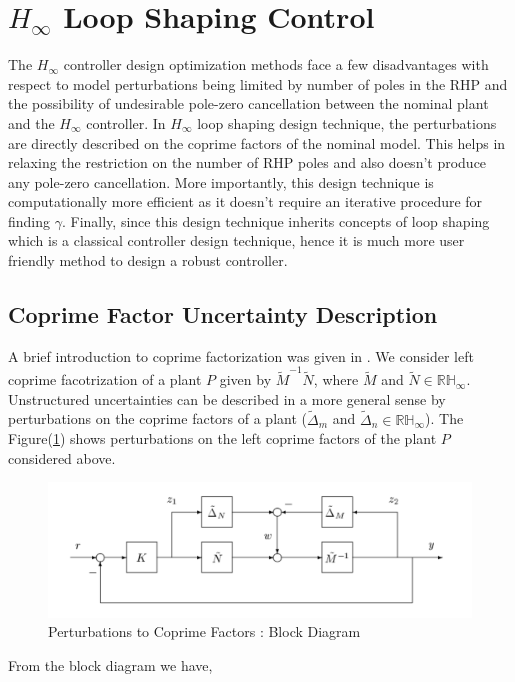 \documentclass[a4paper,12pt]{article}
\begin{document}
\section{$H_{\infty}$ Loop Shaping Control} The $H_{\infty}$ controller design optimization methods face a few disadvantages with respect to model perturbations being limited by number of poles in the RHP and the possibility of undesirable pole-zero cancellation between the nominal plant and the $H_{\infty}$ controller. In $H_{\infty}$ loop shaping design technique, the perturbations are directly described on the coprime factors of the nominal model. This helps in relaxing the restriction on the number of RHP poles and also doesn't produce any pole-zero cancellation. More importantly, this design technique is computationally more efficient as it doesn't require an iterative procedure for finding $\gamma$. Finally, since this design technique inherits concepts of loop shaping which is a classical controller design technique, hence it is much more user friendly method to design a robust controller.
	\subsection{Coprime Factor Uncertainty Description} A brief introduction to coprime factorization was given in \cite{prev}. We consider left coprime facotrization of a plant $P$ given by $\tilde{M}^{-1}\tilde{N}$, where $\tilde{M}$ and $\tilde{N} \in \mathbb{RH}_{\infty}$. 
% 
%			  
%			  
	Unstructured uncertainties can be described in a more general sense by perturbations on the coprime factors of a plant ($\tilde{\Delta}_{m}$ and $\tilde{\Delta}_{n} \in \mathbb{RH}_{\infty}$). The Figure(\ref{co2}) shows perturbations on the left coprime factors of the plant $P$ considered above. 
		\begin{figure}[H]
			  \centering
			  \includegraphics[scale=0.5]{co2}
%			  
			  \caption{Perturbations to Coprime Factors : Block Diagram}
			 \label{co2}
		\end{figure}	From the block diagram we have,
	
\end{document}
